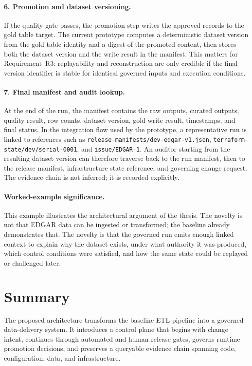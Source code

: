 \paragraph{6. Promotion and dataset versioning.}
If the quality gate passes, the promotion step writes the approved records to
the gold table target. The current prototype computes a deterministic dataset
version from the gold table identity and a digest of the promoted content, then
stores both the dataset version and the write result in the manifest. This
matters for Requirement~R3: replayability and reconstruction are only credible
if the final version identifier is stable for identical governed inputs and
execution conditions.

\paragraph{7. Final manifest and audit lookup.}
At the end of the run, the manifest contains the raw outputs, curated outputs,
quality result, row counts, dataset version, gold write result, timestamps, and
final status. In the integration flow used by the prototype, a representative
run is linked to references such as
\texttt{release-manifests/dev-edgar-v1.json},
\texttt{terraform-state/dev/serial-0001}, and
\texttt{issue/EDGAR-1}. An auditor starting from the resulting dataset version
can therefore traverse back to the run manifest, then to the release
manifest, infrastructure state reference, and governing change request. The
evidence chain is not inferred; it is recorded explicitly.

\paragraph{Worked-example significance.}
This example illustrates the architectural argument of the thesis. The novelty
is not that EDGAR data can be ingested or transformed; the baseline already
demonstrates that. The novelty is that the governed run emits enough linked
context to explain why the dataset exists, under what authority it was
produced, which control conditions were satisfied, and how the same state could
be replayed or challenged later.

\section{Summary}
\noindent
The proposed architecture transforms the baseline ETL pipeline into a governed
data-delivery system. It introduces a control plane that begins with change
intent, continues through automated and human release gates, governs runtime
promotion decisions, and preserves a queryable evidence chain spanning code,
configuration, data, and infrastructure.

